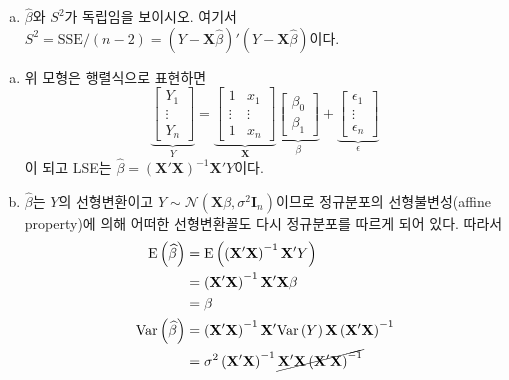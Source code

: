 \documentclass[answers]{exam}
\begin{document}
\begin{questions}
\begin{enumerate}[(a)]
      \item $\widehat{\beta}$와 $S^{2}$가 독립임을 보이시오. 여기서 $S^{2}=\mathrm{SSE}/\left(n-2\right)=\left(Y-\mathbf{X}\widehat{\beta}\right)'\left(Y-\mathbf{X}\widehat{\beta}\right)$이다.
    \end{enumerate}
    \begin{solution}
      \begin{enumerate}[(a)]
        \item 위 모형은 행렬식으로 표현하면
        \begin{equation}
          \underbrace{\begin{bmatrix}Y_{1}\\ \vdots \\ Y_{n}  \end{bmatrix}}_{Y} = \underbrace{\begin{bmatrix}1 & x_{1}\\ \vdots & \vdots \\ 1 & x_{n}  \end{bmatrix}}_{\mathbf{X}}\underbrace{\begin{bmatrix}\beta_{0}\\ \beta_{1}  \end{bmatrix}}_{\beta}+\underbrace{\begin{bmatrix}\epsilon_{1}\\ \vdots \\ \epsilon_{n}  \end{bmatrix}}_{\epsilon}
        \end{equation}
        이 되고 LSE는 $\widehat{\beta}=\left(\mathbf{X}'\mathbf{X}\right)^{-1}\mathbf{X}'Y$이다.
        \item $\widehat{\beta}$는 $Y$의 선형변환이고 $Y\sim \mathcal{N}\left(\mathbf{X}\beta,\sigma^{2}\mathbf{I}_{n}\right)$이므로 정규분포의 선형불변성(affine property)에 의해 어떠한 선형변환꼴도 다시 정규분포를 따르게 되어 있다. 따라서
        \begin{align}
          \mathrm{E}\left(\widehat{\beta}\right) &= \mathrm{E}\left(\left(\mathbf{X}'\mathbf{X}\right)^{-1}\mathbf{X}'Y\right)\\
          &= \left(\mathbf{X}'\mathbf{X}\right)^{-1}\mathbf{X}'\mathbf{X}\beta\\
          &= \beta\\
          \mathrm{Var}\left(\widehat{\beta}\right) &= \left(\mathbf{X}'\mathbf{X}\right)^{-1}\mathbf{X}'\mathrm{Var}\left(Y\right)\mathbf{X}\left(\mathbf{X}'\mathbf{X}\right)^{-1}\\
          &= \sigma^{2}\left(\mathbf{X}'\mathbf{X}\right)^{-1}\cancel{\mathbf{X}'\mathbf{X}\left(\mathbf{X}'\mathbf{X}\right)^{-1}}\\

\end{align}
\end{enumerate}
\end{solution}
\end{questions}
\end{document}
